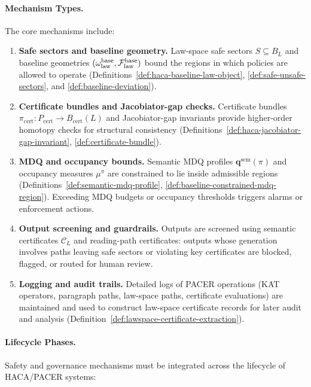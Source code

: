 \documentclass[11pt]{book}
\theoremstyle{plain}
\theoremstyle{definition}
\theoremstyle{remark}
\begin{document}
\paragraph{Mechanism Types.}
The core mechanisms include:
\begin{enumerate}
  \item \textbf{Safe sectors and baseline geometry.} Law-space safe
        sectors $S\subseteq B_L$ and baseline geometries
        $(\omega_{\mathrm{law}}^{\mathrm{base}},\mathcal{F}_{\mathrm{law}}^{\mathrm{base}})$ bound the
        regions in which policies are allowed to operate
        (Definitions~\ref{def:haca-baseline-law-object},
         \ref{def:safe-unsafe-sectors}, and
         \ref{def:baseline-deviation}).
  \item \textbf{Certificate bundles and Jacobiator-gap checks.}
        Certificate bundles $\pi_{\mathrm{cert}}:P_{\mathrm{cert}}\to
        B_{\mathrm{cert}}(L)$ and Jacobiator-gap invariants provide
        higher-order homotopy checks for structural consistency
        (Definitions~\ref{def:haca-jacobiator-gap-invariant},
         \ref{def:certificate-bundle}).
  \item \textbf{MDQ and occupancy bounds.} Semantic MDQ profiles
        $\mathbf{q}^{\mathrm{sem}}(\pi)$ and occupancy measures
        $\mu^\pi$ are constrained to lie inside admissible regions
        (Definitions~\ref{def:semantic-mdq-profile},
         \ref{def:baseline-constrained-mdq-region}). Exceeding MDQ
        budgets or occupancy thresholds triggers alarms or enforcement
        actions.
  \item \textbf{Output screening and guardrails.} Outputs are screened
        using semantic certificates $\mathcal{C}_L$ and reading-path
        certificates: outputs whose generation involves paths leaving
        safe sectors or violating key certificates are blocked,
        flagged, or routed for human review.
  \item \textbf{Logging and audit trails.} Detailed logs of PACER
        operations (KAT operators, paragraph paths, law-space paths,
        certificate evaluations) are maintained and used to construct
        law-space certificate records for later audit and analysis
        (Definition~\ref{def:lawspace-certificate-extraction}).
\end{enumerate}

\paragraph{Lifecycle Phases.}
Safety and governance mechanisms must be integrated across the
lifecycle of HACA/PACER systems:
\end{document}
